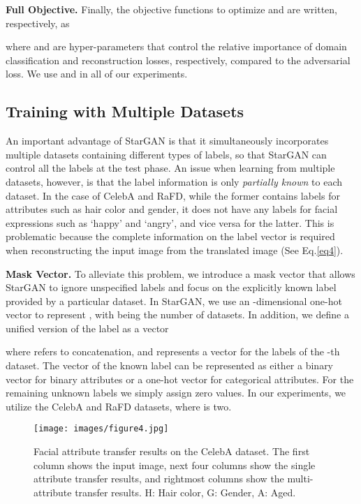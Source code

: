\documentclass[10pt,twocolumn,letterpaper]{article}
\begin{document}
\medskip

\noindent \textbf{Full Objective.} Finally, the objective functions to optimize  and  are written, respectively, as 

where  and  are hyper-parameters that control the relative importance of domain classification and reconstruction losses, respectively, compared to the adversarial loss. We use  and  in all of our experiments. 

\medskip

\subsection{Training with Multiple Datasets} \label{section 3.2}
An important advantage of StarGAN is that it simultaneously incorporates multiple datasets containing different types of labels, so that StarGAN can control all the labels at the test phase. An issue when learning from multiple datasets, however, is that the label information is only \textit{partially known} to each dataset. In the case of CelebA\thinspace\cite{liu2015faceattributes} and RaFD\thinspace\cite{langner2010presentation}, while the former contains labels for attributes such as hair color and gender, it does not have any labels for facial expressions such as `happy' and `angry', and vice versa for the latter. This is problematic because the complete information on the label vector  is required when reconstructing the input image  from the translated image  (See Eq.\thinspace\eqref{eq4}). 

\medskip

\noindent\textbf{Mask Vector.} To alleviate this problem, we introduce a mask vector  that allows StarGAN to ignore unspecified labels and focus on the explicitly known label provided by a particular dataset. In StarGAN, we use an -dimensional one-hot vector to represent , with  being the number of datasets. In addition, we define a unified version of the label as a vector

\noindent where  refers to concatenation, and  represents a vector for the labels of the -th dataset. The vector of the known label  can be represented as either a binary vector for binary attributes or a one-hot vector for categorical attributes. For the remaining  unknown labels we simply assign zero values. In our experiments, we utilize the CelebA and RaFD datasets, where  is two. 

\medskip

\begin{figure*}[ht]
\centering 
\centerline{\texttt{[image: images/figure4.jpg]}}
\caption{Facial attribute transfer results on the CelebA dataset. The first column shows the input image, next four columns show the single attribute transfer results, and rightmost columns show the multi-attribute transfer results. H: Hair color, G: Gender, A: Aged.}
\label{qual_celeb}

\end{figure*}
\end{document}
